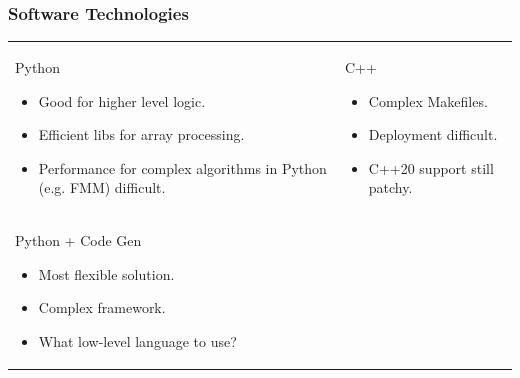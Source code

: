 \documentclass[dvipsnames,10pt]{beamer}
\begin{document}
\begin{frame}
\frametitle{Software Technologies}

\begin{tabular}{ll}
\begin{minipage}[t]{6cm}
{\color{blue} Python}
\begin{itemize}
\item Good for higher level logic.
\item Efficient libs for array processing.
\item Performance for complex algorithms in Python (e.g. FMM) difficult\footnotemark.
\end{itemize}
\end{minipage} &
\begin{minipage}[t]{6cm}
{\color{blue} C++}
\begin{itemize}
\item Complex Makefiles.
\item Deployment difficult.
\item C++20 support still patchy.
\end{itemize}
\end{minipage}\\
\begin{minipage}[t]{6cm}
{\color{blue}Python + Code Gen}
\begin{itemize}
\item Most flexible solution.
\item Complex framework.
\item What low-level language to use?
\end{itemize}
\end{minipage} & 
\end{tabular}


\end{frame}
\end{document}
